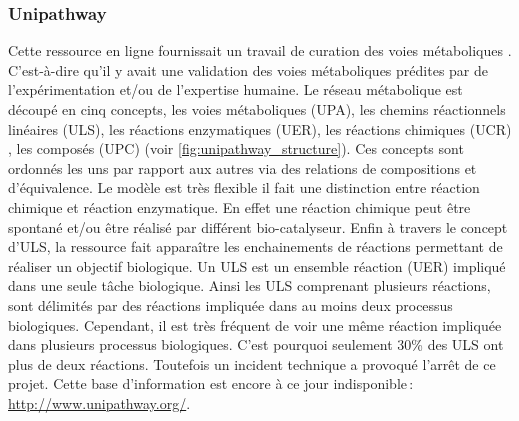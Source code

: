 \begin{refsegment}
    \subsubsection{Unipathway}
    
    Cette ressource en ligne fournissait un travail de curation des voies métaboliques \cite{morgat2011unipathway}. C'est-à-dire qu'il y avait une validation des voies métaboliques prédites par de l'expérimentation et/ou de l'expertise humaine. Le réseau métabolique est découpé en cinq concepts, les voies métaboliques (\acrfull{UPA}), les chemins réactionnels linéaires (\acrfull{ULS}), les réactions enzymatiques (\acrfull{UER}), les réactions chimiques (\acrfull{UCR}) , les composés (\acrfull{UPC}) (voir \cref{fig:unipathway_structure}). Ces concepts sont ordonnés les uns par rapport aux autres via des relations de compositions et d'équivalence. Le modèle est très flexible il fait une distinction entre réaction chimique et réaction enzymatique. En effet une réaction chimique peut être spontané et/ou être réalisé par différent bio-catalyseur. Enfin à travers le concept d'\acrfull{ULS}, la ressource fait apparaître les enchainements de réactions permettant de réaliser un objectif biologique. Un \acrfull{ULS} est un ensemble réaction (\acrfull{UER}) impliqué dans une seule tâche biologique. Ainsi les \acrfull{ULS} comprenant plusieurs réactions, sont délimités par des réactions impliquée dans au moins deux processus biologiques. Cependant, il est très fréquent de voir une même réaction impliquée dans plusieurs processus biologiques. C'est pourquoi seulement 30\% des \acrfull{ULS} ont plus de deux réactions. Toutefois un incident technique a provoqué l'arrêt de ce projet. Cette base d'information est encore à ce jour indisponible : \url{http://www.unipathway.org/}.
    
    

\end{refsegment}
